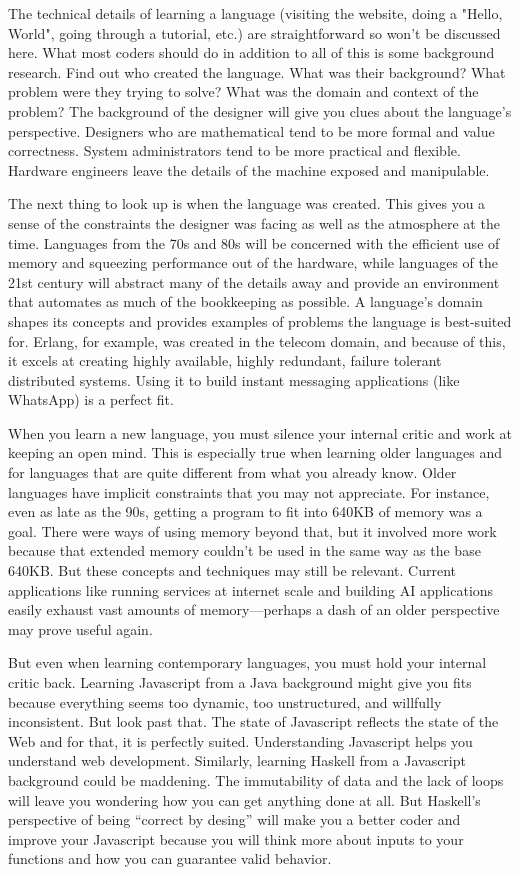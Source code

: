 The technical details of learning a language (visiting the website, doing a
"Hello, World", going through a tutorial, etc.) are straightforward so won't be
discussed here. What most coders should do in addition to all of this is some
background research. Find out who created the language. What was their
background? What problem were they trying to solve?  What was the domain and
context of the problem? The background of the designer will give you clues
about the language's perspective. Designers who are mathematical tend to be
more formal and value correctness. System administrators tend to be more
practical and flexible. Hardware engineers leave the details of the machine
exposed and manipulable.

The next thing to look up is when the language was created. This gives you a
sense of the constraints the designer was facing as well as the atmosphere at
the time. Languages from the 70s and 80s will be concerned with the efficient
use of memory and squeezing performance out of the hardware, while languages of
the 21st century will abstract many of the details away and provide an
environment that automates as much of the bookkeeping as possible. A language's
domain shapes its concepts and provides examples of problems the language is
best-suited for. Erlang, for example, was created in the telecom domain, and
because of this, it excels at creating highly available, highly redundant,
failure tolerant distributed systems. Using it to build instant messaging
applications (like WhatsApp) is a perfect fit.

When you learn a new language, you must silence your internal critic and work
at keeping an open mind. This is especially true when learning older languages
and for languages that are quite different from what you already know. Older
languages have implicit constraints that you may not appreciate. For instance,
even as late as the 90s, getting a program to fit into 640KB of memory was a
goal. There were ways of using memory beyond that, but it involved more work
because that extended memory couldn't be used in the same way as the base
640KB. But these concepts and techniques may still be relevant. Current
applications like running services at internet scale and building AI
applications easily exhaust vast amounts of memory---perhaps a dash of an older
perspective may prove useful again.

But even when learning contemporary languages, you must hold your internal
critic back. Learning Javascript from a Java background might give you fits
because everything seems too dynamic, too unstructured, and willfully
inconsistent. But look past that. The state of Javascript reflects the state of
the Web and for that, it is perfectly suited. Understanding Javascript helps
you understand web development. Similarly, learning Haskell from a Javascript
background could be maddening. The immutability of data and the lack of loops
will leave you wondering how you can get anything done at all. But Haskell's
perspective of being ``correct by desing'' will make you a better coder and
improve your Javascript because you will think more about inputs to your
functions and how you can guarantee valid behavior.

